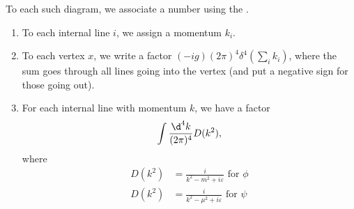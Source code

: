 \documentclass[a4paper]{article}
\begin{document}
To each such diagram, we associate a number using the .
\begin{enumerate}
  \item To each internal line $i$, we assign a momentum $k_i$.
  \item To each vertex $x$, we write a factor $(-ig)(2\pi)^4 \delta^4(\sum_i k_i)$, where the sum goes through all lines going into the vertex (and put a negative sign for those going out).
  \item For each internal line with momentum $k$, we have a factor
    \[
      \int \frac{\d^4 k}{(2\pi)^4} D(k^2),
    \]
    where
    \begin{align*}
      D(k^2) &= \frac{i}{k^2 - m^2 + i\varepsilon}\text{ for }\phi\\
      D(k^2) &= \frac{i}{k^2 - \mu^2 + i\varepsilon}\text{ for }\psi
    \end{align*}
\end{enumerate}
\end{document}
